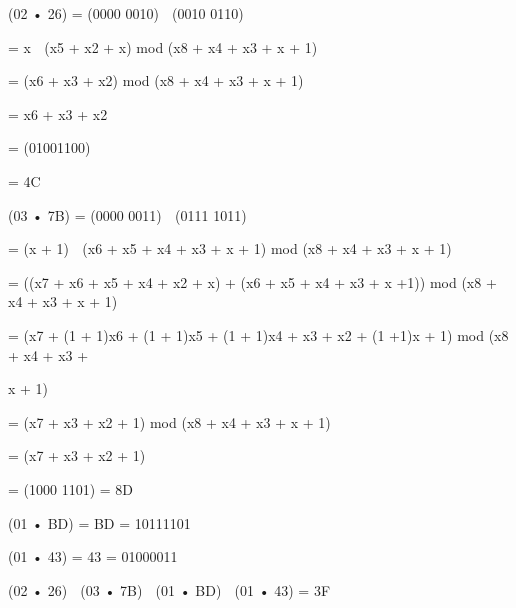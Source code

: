 \documentclass{article}
\begin{document}

(02 • 26) = (0000 0010)  (0010 0110) 

                = x  (x5 + x2 + x)  mod (x8 + x4 + x3 + x + 1)


   = (x6 + x3 + x2) mod (x8 + x4 + x3 + x + 1)


   = x6 + x3 + x2


   = (01001100)


   = 4C

(03 • 7B) = (0000 0011)  (0111 1011) 

                 = (x + 1)  (x6 + x5 + x4 + x3 + x + 1) mod (x8 + x4  +  x3 + x + 1)



    = ((x7 + x6 + x5 + x4 + x2 + x) + (x6 + x5 + x4 + x3 + x  +1)) mod (x8 + x4 +  x3 + x + 1)

                = (x7 + (1 + 1)x6 + (1 + 1)x5 + (1 + 1)x4 + x3 + x2 + (1 +1)x + 1) mod (x8 + x4 + x3 + 

                    x + 1)

                = (x7 + x3 + x2 + 1) mod (x8 + x4 + x3 + x + 1)


   = (x7 + x3 + x2 + 1)


   = (1000 1101)  = 8D    

(01 • BD) = BD = 10111101

(01 • 43) = 43 = 01000011

(02 • 26)  (03 • 7B)  (01 • BD)  (01 • 43) = 3F
\end{document}
